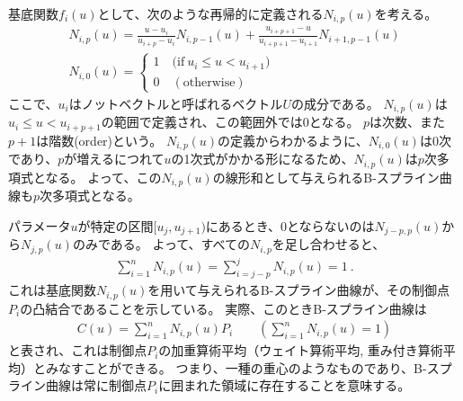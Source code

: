 \clearpage
基底関数$f_i(u)$として、次のような再帰的に定義される$N_{i, p}(u)$を考える。
\begin{gather*}
  N_{i, p}(u)
  = \frac{u-u_i}{u_{i+p}-u_i}N_{i, p-1}(u)
    +\frac{u_{i+p+1}-u}{u_{i+p+1}-u_{i+1}}N_{i+1, p-1}(u)\\
  N_{i, 0}(u)
  = \left\{
    \begin{array}{l}
      1\quad \big(\text{if}~u_i \leq u < u_{i+1}\big)\\
      0\quad (\text{otherwise})
    \end{array}
    \right.
\end{gather*}
ここで、$u_i$はノットベクトルと呼ばれるベクトル$U$の成分である。
$N_{i, p}(u)$は$u_i \leq u < u_{i+p+1}$の範囲で定義され、この範囲外では$0$となる。
$p$は次数、また$p+1$は階数(order)という。
$N_{i, p}(u)$の定義からわかるように、$N_{i, 0}(u)$は0次であり、$p$が増えるにつれて$u$の1次式がかかる形になるため、$N_{i, p}(u)$は$p$次多項式となる。
よって、この$N_{i, p}(u)$の線形和として与えられるB-スプライン曲線も$p$次多項式となる。

パラメータ$u$が特定の区間$[u_j , u_{j+1})$にあるとき、0とならないのは$N_{j-p, p}(u)$から$N_{j, p}(u)$のみである。
よって、すべての$N_{i, p}$を足し合わせると、
\begin{align*}
  \sum_{i=1}^nN_{i, p}(u) = \sum_{i=j-p}^j\!\!N_{i, p}(u) = 1\ .
\end{align*}
これは基底関数$N_{i, p}(u)$を用いて与えられるB-スプライン曲線が、その制御点$P_i$の凸結合であることを示している。
実際、このときB-スプライン曲線は
\begin{align*}
  C(u) = \sum_{i=1}^nN_{i, p}(u)P_i\qquad\left(\sum_{i=1}^nN_{i, p}(u) =1\right)
\end{align*}
と表され、これは制御点$P_i$の加重算術平均（ウェイト算術平均, 重み付き算術平均）とみなすことができる。
つまり、一種の重心のようなものであり、B-スプライン曲線は常に制御点$P_i$に囲まれた領域に存在することを意味する。

